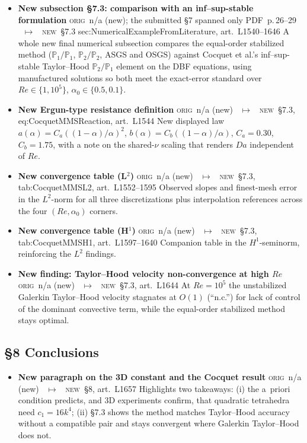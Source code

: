 \documentclass[11pt]{article}
\newcommand{\Orig}{\textcolor{origc}{\footnotesize\textsc{orig}}}
\newcommand{\New}{\textcolor{newc}{\footnotesize\textsc{new}}}
\newcommand{\code}[1]{\textcolor{newc}{\ttfamily\small #1}}
\newcommand{\pdfp}[1]{PDF~p.\,#1}
\newcommand{\artl}[1]{art.\ L#1}       %
\newcommand{\ch}[4]{%
  \item \textbf{#1}\newline
    {\footnotesize\Orig\ #2 \ \textcolor{locc}{$\longmapsto$} \ \New\ #3}\newline
    #4}
\begin{document}
\begin{itemize}
\ch{\textbf{New subsection \S7.3}: comparison with an inf--sup-stable formulation}
   {n/a (new); the submitted \S7 spanned only \pdfp{26}--29}
   {\S7.3 \code{sec:NumericalExampleFromLiterature}, \artl{1540}--1646}
   {A whole new final numerical subsection compares the equal-order stabilized method
    ($\mathbb{P}_1/\mathbb{P}_1$, $\mathbb{P}_2/\mathbb{P}_2$, ASGS and OSGS) against Cocquet et al.'s
    inf--sup-stable Taylor--Hood $\mathbb{P}_2/\mathbb{P}_1$ element on the DBF equations, using
    manufactured solutions so both meet the exact-error standard over $Re\in\{1,10^5\}$,
    $\alpha_0\in\{0.5,0.1\}$.}
\ch{New Ergun-type resistance definition}
   {n/a (new)}
   {\S7.3, \code{eq:CocquetMMSReaction}, \artl{1544}}
   {New displayed law $a(\alpha)=C_a((1-\alpha)/\alpha)^2$, $b(\alpha)=C_b((1-\alpha)/\alpha)$,
    $C_a{=}0.30$, $C_b{=}1.75$, with a note on the shared-$\nu$ scaling that renders $Da$
    independent of $Re$.}
\ch{New convergence table (L$^2$)}
   {n/a (new)}
   {\S7.3, \code{tab:CocquetMMSL2}, \artl{1552}--1595}
   {Observed slopes and finest-mesh error in the $L^2$-norm for all three discretizations plus
    interpolation references across the four $(Re,\alpha_0)$ corners.}
\ch{New convergence table (H$^1$)}
   {n/a (new)}
   {\S7.3, \code{tab:CocquetMMSH1}, \artl{1597}--1640}
   {Companion table in the $H^1$-seminorm, reinforcing the $L^2$ findings.}
\ch{New finding: Taylor--Hood velocity non-convergence at high $Re$}
   {n/a (new)}
   {\S7.3, \artl{1644}}
   {At $Re{=}10^5$ the unstabilized Galerkin Taylor--Hood velocity stagnates at $O(1)$ (``n.c.'')
    for lack of control of the dominant convective term, while the equal-order stabilized method
    stays optimal.}
\end{itemize}

\subsection{\S8 Conclusions}
\begin{itemize}
\ch{New paragraph on the 3D constant and the Cocquet result}
   {n/a (new)}
   {\S8, \artl{1657}}
   {Highlights two takeaways: (i) the a~priori condition predicts, and 3D experiments confirm, that
    quadratic tetrahedra need $c_1=16k^4$; (ii) \S7.3 shows the method matches Taylor--Hood accuracy
    without a compatible pair and stays convergent where Galerkin Taylor--Hood does not.}
\end{itemize}
\end{document}
